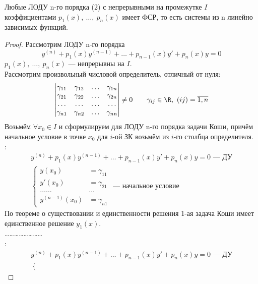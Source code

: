 \begin{theorem*}
    Любые ЛОДУ n-го порядка (2) с непрерывными на промежутке $I$ коэффициентами $p_1(x),\ \ldots,\ p_n(x)$ имеет ФСР, то есть системы из n линейно зависимых функций.
\end{theorem*}
\begin{proof}
    Рассмотрим ЛОДУ n-го порядка
    \[
        y^{(n)} + p_1(x)y^{(n-1)} + \ldots + p_{n-1}(x) y' + p_n(x) y = 0
    \]
    $p_1(x),\ \ldots,\ p_n(x)$ --- непрерывны на $I$. \\
    Рассмотрим произвольный числовой определитель, отличный от нуля:
    \[
        \begin{vmatrix}
            \gamma_{11} & \gamma_{12} & \ldots & \gamma_{1n} \\
            \gamma_{21} & \gamma_{22} & \ldots & \gamma_{2n} \\
            \ldots & \ldots & \ldots & \ldots \\
            \gamma_{n1} & \gamma_{n2} & \ldots & \gamma_{nn}
        \end{vmatrix} \ne 0\qquad \gamma_{ij} \in \R,\ (ij) = \overline{1,n}
    \]
    Возьмём $\forall x_0 \in I$ и сформулируем для ЛОДУ n-го порядка задачи Коши, причём начальное условие в точке $x_0$ для $i$-ой ЗК возьмём из $i$-го столбца определителя.\\
    :
    \begin{gather*}
        y^{(n)} + p_1(x)y^{(n-1)} + \ldots + p_{n-1}(x) y' + p_n(x) y = 0\text{ --- ДУ}\\
        \left\{ \begin{aligned}
            y(x_0) &= \gamma_{11} \\
            y'(x_0) &= \gamma_{21}\\
            \ldots\ldots&\ldots \\
            y^{(n-1)}(x_0) &= \gamma_{n1} 
        \end{aligned}\right.\text{ --- начальное условие}
    \end{gather*}
    По теореме о существовании и единственности решения 1-ая задача Коши имеет единственное решение $y_1(x)$. \\
    \ldots\ldots\ldots\ldots\ldots\ldots\ldots\ldots \\
    :
    \begin{gather*}
        y^{(n)} + p_1(x)y^{(n-1)} + \ldots + p_{n-1}(x) y' + p_n(x) y = 0\text{ --- ДУ}\\
        \left\{ \begin{aligned}

\end{aligned}
\end{gather*}
\end{proof}
